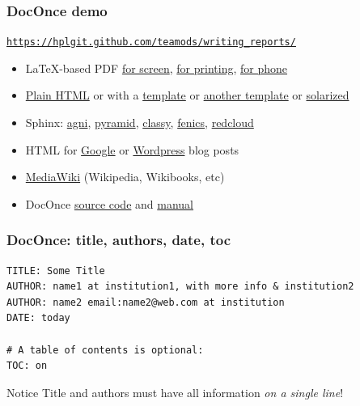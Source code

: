 \documentclass{beamer}
\newcounter{doconce:movie:counter}
\begin{document}
\begin{frame}
\frametitle{DocOnce demo}

\href{{https://hplgit.github.com/teamods/writing_reports/}}{\nolinkurl{https://hplgit.github.com/teamods/writing_reports/}}
\begin{itemize}
 \item LaTeX-based PDF \href{{https://hplgit.github.com/teamods/writing_reports/_static/report.pdf}}{for screen}, \href{{https://hplgit.github.com/teamods/writing_reports/_static/report_4printing.pdf}}{for printing}, \href{{https://hplgit.github.com/teamods/writing_reports/_static/report_4phone.pdf}}{for phone}
 \item \href{{https://hplgit.github.com/teamods/writing_reports/_static/report_do.html}}{Plain HTML} or with a \href{{https://hplgit.github.com/teamods/writing_reports/_static/report_vagrant.html}}{template} or \href{{https://hplgit.github.com/teamods/writing_reports/_static/report_github_minimal.html}}{another template} or \href{{https://hplgit.github.com/teamods/writing_reports/_static/report_solarized.html}}{solarized}
 \item Sphinx: \href{{https://hplgit.github.com/teamods/writing_reports/_static/sphinx-agni/index.html}}{agni}, \href{{https://hplgit.github.com/teamods/writing_reports/_static/sphinx-pyramid/report.html}}{pyramid}, \href{{https://hplgit.github.com/teamods/writing_reports/_static/sphinx-classy/report.html}}{classy}, \href{{https://hplgit.github.com/teamods/writing_reports/_static/sphinx-fenics_minimal/report.html}}{fenics}, \href{{https://hplgit.github.com/teamods/writing_reports/_static/sphinx-fenics_minimal/report.html}}{redcloud}
 \item HTML for \href{{https://doconce-report-demo.blogspot.no/}}{Google} or \href{{https://doconcereportdemo.wordpress.com/}}{Wordpress} blog posts
 \item \href{{https://doconcedemo.shoutwiki.com/wiki/DocOnce_demo_page}}{MediaWiki} (Wikipedia, Wikibooks, etc)
 \item DocOnce \href{{https://hplgit.github.com/teamods/writing_reports/_static/report.do.txt.html}}{source code} and \href{{https://hplgit.github.io/doconce/doc/src/pub/manual/html/manual.html}}{manual}
\end{itemize}
\noindent
\end{frame}

\begin{frame}
\frametitle{DocOnce: title, authors, date, toc}

\begin{Verbatim}[numbers=none,fontsize=\fontsize{9pt}{9pt},baselinestretch=0.95]
TITLE: Some Title
AUTHOR: name1 at institution1, with more info & institution2
AUTHOR: name2 email:name2@web.com at institution
DATE: today

# A table of contents is optional:
TOC: on

\end{Verbatim}

\begin{block}{Notice}
Title and authors must have all information \emph{on a single line}!
\end{block}
\end{frame}
\end{document}
